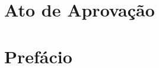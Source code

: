 \documentclass[msc]{ita}
\begin{document}
\maketitle


\tableofcontents

\mainmatter
 
\chapter*{Ato de Aprovação} 


\chapter*{Prefácio} 




\renewcommand\bibname{\itareferencesnamebabel} 

\end{document}
